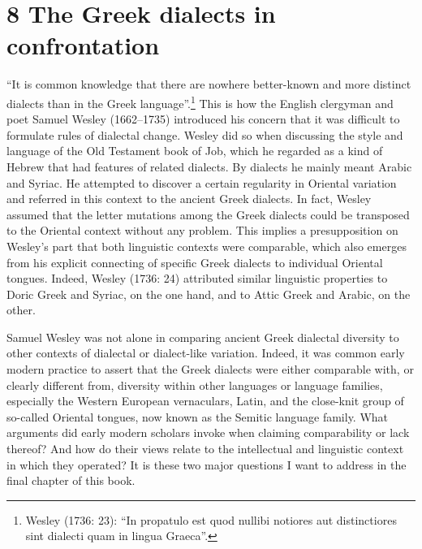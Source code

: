 \clearpage\clearpage\section[8 The Greek dialects in confrontation]{\textsc{8 }The Greek dialects in confrontation}
\hypertarget{Toc19704857}{}\begin{styleStandard}
“It is common knowledge that there are nowhere better-known and more distinct dialects than in the Greek language”.\footnote{ Wesley (1736: 23): “In propatulo est quod nullibi notiores aut distinctiores sint dialecti quam in lingua Graeca”.} This is how the English clergyman and poet Samuel Wesley (1662–1735) introduced his concern that it was difficult to formulate rules of dialectal change. Wesley did so when discussing the style and language of the Old Testament book of Job, which he regarded as a kind of Hebrew that had features of related dialects. By dialects he mainly meant Arabic and Syriac. He attempted to discover a certain regularity in Oriental variation and referred in this context to the ancient Greek dialects. In fact, Wesley assumed that the letter mutations among the Greek dialects could be transposed to the Oriental context without any problem. This implies a presupposition on Wesley’s part that both linguistic contexts were comparable, which also emerges from his explicit connecting of specific Greek dialects to individual Oriental tongues. Indeed, Wesley (1736: 24) attributed similar linguistic properties to Doric Greek and Syriac, on the one hand, and to Attic Greek and Arabic, on the other.
\end{styleStandard}

\begin{styleStandard}
Samuel Wesley was not alone in comparing ancient Greek dialectal diversity to other contexts of dialectal or dialect-like variation. Indeed, it was common early modern practice to assert that the Greek dialects were either comparable with, or clearly different from, diversity within other languages or language families, especially the Western European vernaculars, Latin, and the close-knit group of so-called Oriental tongues, now known as the Semitic language family. What arguments did early modern scholars invoke when claiming comparability or lack thereof? And how do their views relate to the intellectual and linguistic context in which they operated? It is these two major questions I want to address in the final chapter of this book.
\end{styleStandard}

